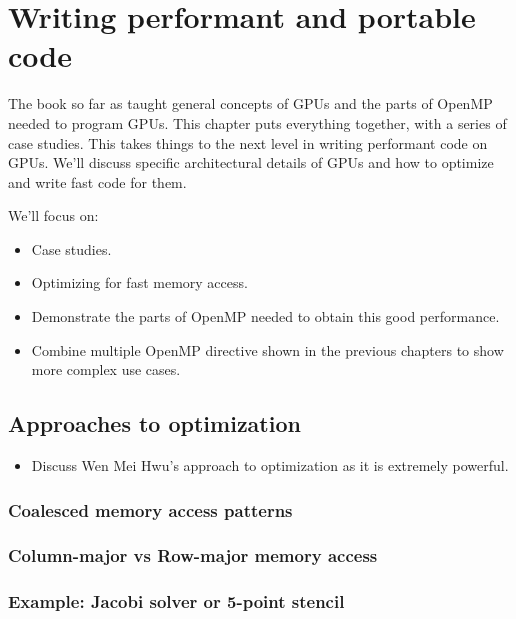 
\def\ArtDir{07.Portable/figures}


\chapter{Writing performant and portable code}
\label{chapter:portable}

The book so far as taught general concepts of GPUs and the parts of OpenMP needed to program GPUs.
This chapter puts everything together, with a series of case studies.
This takes things to the next level in writing performant code on GPUs.
We'll discuss specific architectural details of GPUs and how to optimize and write fast code for them.

We'll focus on:
\begin{itemize}
  \item Case studies.
  \item Optimizing for fast memory access.
  \item Demonstrate the parts of OpenMP needed to obtain this good performance.
  \item Combine multiple OpenMP directive shown in the previous chapters to show more complex use cases.
\end{itemize}

\section{Approaches to optimization}
\begin{itemize}
  \item Discuss Wen Mei Hwu's approach to optimization as it is extremely powerful.
\end{itemize}

\subsection{Coalesced memory access patterns}
\subsection{Column-major vs Row-major memory access}
\subsection{Example: Jacobi solver or 5-point stencil}

